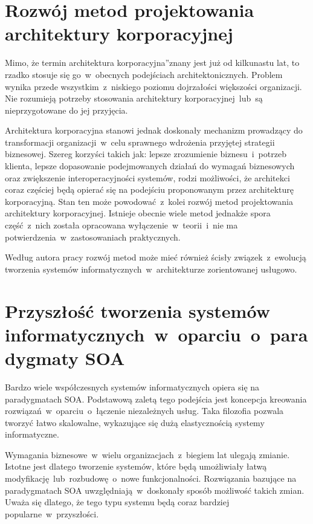 \section{Rozwój metod projektowania architektury korporacyjnej}
Mimo, że termin \quotedblbase architektura korporacyjna\textquotedblright znany jest już od kilkunastu lat, to rzadko stosuje się go~w~obecnych podejściach architektonicznych. Problem wynika przede wszystkim~z~niskiego poziomu dojrzałości większości organizacji.  Nie rozumieją potrzeby stosowania architektury korporacyjnej~lub~są nieprzygotowane do jej przyjęcia. \cite{SobArchKorpProg}

Architektura korporacyjna stanowi jednak doskonały mechanizm prowadzący do transformacji organizacji~w~celu sprawnego wdrożenia przyjętej strategii biznesowej. Szereg korzyści takich jak: lepsze zrozumienie biznesu~i~potrzeb klienta, lepsze dopasowanie podejmowanych działań do wymagań biznesowych oraz zwiększenie interoperacyjności systemów, rodzi możliwości, że architekci coraz częściej będą opierać się na podejściu proponowanym przez architekturę korporacyjną. \cite{ArchKorpAdmPub} Stan ten może powodować~z~kolei rozwój metod projektowania architektury korporacyjnej. Istnieje obecnie wiele metod jednakże spora część~z~nich została opracowana wyłączenie~w~teorii~i~nie ma potwierdzenia~w~zastosowaniach praktycznych.

Według autora pracy rozwój metod może mieć również ścisły związek~z~ewolucją tworzenia systemów informatycznych~w~architekturze zorientowanej usługowo.

\section{Przyszłość tworzenia systemów informatycznych~w~oparciu~o~paradygmaty SOA}
Bardzo wiele współczesnych systemów informatycznych opiera się na paradygmatach SOA. Podstawową zaletą tego podejścia jest koncepcja kreowania rozwiązań~w~oparciu~o~łączenie niezależnych usług. Taka filozofia pozwala tworzyć łatwo skalowalne, wykazujące się dużą elastycznością systemy informatyczne. 

Wymagania biznesowe~w~wielu organizacjach~z~biegiem lat ulegają zmianie. Istotne jest dlatego tworzenie systemów, które będą umożliwiały łatwą modyfikację~lub~rozbudowę~o~nowe funkcjonalności. Rozwiązania bazujące na paradygmatach SOA uwzględniają~w~doskonały sposób możliwość takich zmian. Uważa się dlatego, że tego typu systemu będą coraz bardziej popularne~w~przyszłości.

 